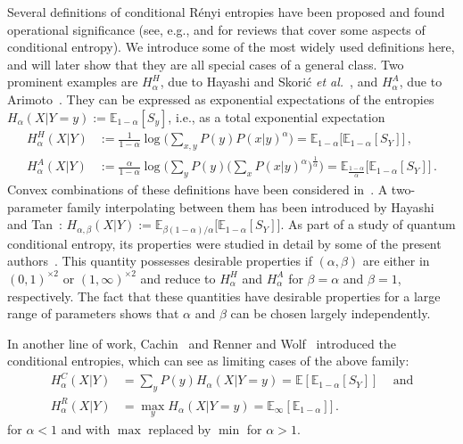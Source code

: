 \documentclass[aps,pra,11pt,onecolumn,nofootinbib,tightenlines]{revtex4-2}
\theoremstyle{definition}
\newcommand{\mb}[1]{\mathbb{#1}}
\begin{document}
Several definitions of conditional Rényi entropies have been proposed and found operational significance (see, e.g., \cite{teixeira2012conditional} and \cite{fehr14conditional} for reviews that cover some aspects of conditional entropy). We introduce some of the most widely used definitions here, and will later show that they are all special cases of a general class. Two prominent examples are $H_{\alpha}^H$, due to Hayashi and Skorić \emph{et al.}~\cite{hayashi2011exponential,vskoric2011sharp}, and $H_{\alpha}^A$, due to Arimoto~\cite{arimoto1977information}. They can be expressed as exponential expectations of the entropies $H_{\alpha}(X|Y\!=\!y) := \mb{E}_{1-\alpha}[S_y]$, i.e., as a total exponential expectation
\begin{align}
\label{Hayashi conditional entropy}
H_{\alpha}^H(X|Y) &:= \frac{1}{1-\alpha}\log \bigg(\sum_{x,y} P(y) P(x|y)^\alpha\bigg) = \mb{E}_{1-\alpha}\big[ \mb{E}_{1-\alpha}[S_Y] \big] \,,\\
\label{Arimoto conditional entropy}
H_{\alpha}^A(X|Y) &:= \frac{\alpha}{1-\alpha}\log{\bigg(\sum_y P(y)\bigg(\sum_x P(x|y)^\alpha\bigg)^\frac{1}{\alpha}\bigg)} = \mb{E}_{\frac{1-\alpha}{\alpha}} \big[ \mb{E}_{1-\alpha}[S_Y] \big] \,.
\end{align}
Convex combinations of these definitions have been considered in~\cite{hayashi2016uniform}.
A two-parameter family interpolating between them has been introduced by Hayashi and Tan~\cite{hayashi2016equivocations}:
$H_{\alpha,\beta}(X|Y) := \mb{E}_{\beta (1-\alpha)/\alpha}\big[ \mb{E}_{1-\alpha}[S_Y] \big]$.
As part of a study of quantum conditional entropy, its properties were studied in detail by some of the present authors~\cite%
{rubboli2024quantum}.
This quantity possesses desirable properties if $(\alpha,\beta)$ are either in $(0,1)^{\times 2}$ or $(1,\infty)^{\times 2}$ and reduce to $H_{\alpha}^H$ and $H_{\alpha}^A$ for $\beta = \alpha$ and $\beta = 1$, respectively. The fact that these quantities have desirable properties for a large range of parameters shows that $\alpha$ and $\beta$ can be chosen largely independently.

In another line of work, Cachin~\cite{cachin1997entropy} and Renner and Wolf~\cite{renner2005simple} introduced the conditional entropies, which can see as limiting cases of the above family:
\begin{align}
    H^C_\alpha(X|Y) & = \sum_yP(y)H_\alpha(X|Y=y) = \mb{E}[\mb{E}_{1-\alpha}[S_Y]]\, \quad \textrm{and} \\
    H^R_\alpha(X|Y) &= \max_{y} H_\alpha(X|Y=y) = \mb{E}_{\infty}[\mb{E}_{1-\alpha}]]\,.    
\end{align} 
for $\alpha < 1$ and with $\max$ replaced by $\min$ for $\alpha > 1$.
\end{document}
